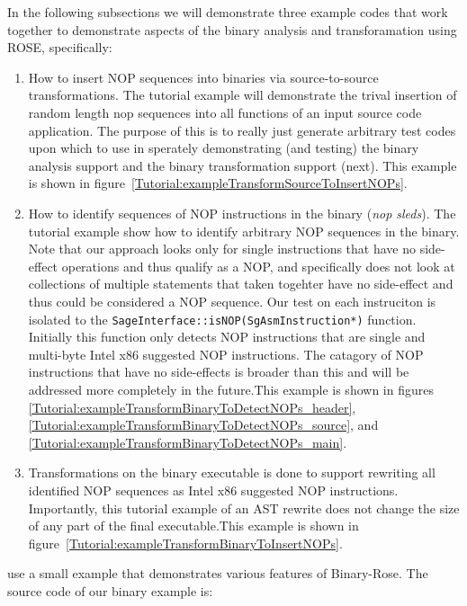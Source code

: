 In the following subsections we will demonstrate three example codes that
work together to demonstrate aspects of the binary analysis and transforamation using
ROSE, specifically:
\begin{enumerate}
   \item How to insert NOP sequences into binaries via source-to-source transformations.
         The tutorial example will demonstrate the trival insertion of random length
         nop sequences into all functions of an input source code application.
         The purpose of this is to really just generate arbitrary test codes
         upon which to use in sperately demonstrating (and testing) the binary analysis 
         support and the binary transformation support (next).  This example is
         shown in figure~\ref{Tutorial:exampleTransformSourceToInsertNOPs}.
   \item How to identify sequences of NOP instructions in the binary ({\em nop sleds}).
         The tutorial example show how to identify arbitrary NOP sequences in the 
         binary.  Note that our approach looks only for single instructions that have
         no side-effect operations and thus qualify as a NOP, and specifically does not
         look at collections of multiple statements that taken togehter have no
         side-effect and thus could be considered a NOP sequence. Our test on each 
         instruciton is isolated to the {\tt SageInterface::isNOP(SgAsmInstruction*)} 
         function.  Initially this function only detects NOP instructions that are
         single and multi-byte Intel x86 suggested NOP instructions.  The catagory of
         NOP instructions that have no side-effects is broader than this and will
         be addressed more completely in the future.This example is
         shown in figures \ref{Tutorial:exampleTransformBinaryToDetectNOPs_header},
         \ref{Tutorial:exampleTransformBinaryToDetectNOPs_source}, and
         \ref{Tutorial:exampleTransformBinaryToDetectNOPs_main}.
   \item Transformations on the binary executable is done to support rewriting
         all identified NOP sequences as Intel x86 suggested NOP instructions.
         Importantly, this tutorial example of an AST rewrite does not change the size 
         of any part of the final executable.This example is
         shown in figure~\ref{Tutorial:exampleTransformBinaryToInsertNOPs}.
\end{enumerate}

use a small example that demonstrates various 
features of Binary-Rose. The source code of our binary example is:

